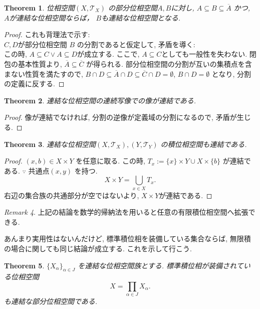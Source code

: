 \documentclass[dvipdfmx]{jbook}
\newcommand{\cl}[1]{\overline{ #1}  }
\newtheorem{theorem}{Theorem}[section]
\theoremstyle{remark}
\newtheorem{remark}[theorem]{Remark}
\theoremstyle{plain}
\begin{document}
\begin{theorem}
	位相空間$\left( X , \mathcal{T}_X \right) $ の部分位相空間$A,B$に対し, $A \subseteq B \subseteq \cl{A} $ かつ, $A$が連結な位相空間ならば， $B$も連結な位相空間となる.
\end{theorem}

\begin{proof}
	これも背理法で示す: \\
	$C,D$が部分位相空間 $B$ の分割であると仮定して, 矛盾を導く:\\
	この時,  $A \subseteq C \lor A \subseteq D$が成立する. 
	ここで, $A \subseteq C$としても一般性を失わない.
	閉包の基本性質より, $\cl{A} \subseteq \cl{C}$ が得られる. 
	部分位相空間の分割が互いの集積点を含まない性質を満たすので, 
	$B \cap D \subseteq \cl{A} \cap D \subseteq \cl{C} \cap D = \emptyset$, 
	$B \cap D = \emptyset$ となり, 分割の定義に反する.
\end{proof}

\begin{theorem}
	連結な位相空間の連続写像での像が連結である.
\end{theorem}

\begin{proof}
	像が連結でなければ, 分割の逆像が定義域の分割になるので, 矛盾が生じる.
\end{proof}

\begin{theorem}
	連結な位相空間$\left( X, \mathcal{T}_X \right) , \left( Y, \mathcal{T}_Y \right) $ の積位相空間も連結である.
\end{theorem}

\begin{proof}
	$(x,b) \in X \times Y $ を任意に取る. この時,
	$T_{x} := \{x\} \times Y \cup X \times \{b\}  $ が連結である. $\because$ 共通点$\left( x,y \right) $ を持つ.\\
	 \[
	X \times Y = \bigcup_{x \in X}T_x 
	.\] 
	右辺の集合族の共通部分が空ではないより, $X \times Y$が連結である.
\end{proof}

\begin{remark}
	上記の結論を数学的帰納法を用いると任意の有限積位相空間へ拡張できる.
\end{remark}

あんまり実用性はないんだけど, 標準積位相を装備している集合ならば, 無限積の場合に関しても同じ結論が成立する. これを示して行こう.

\begin{theorem}
	$\{X_{\alpha}\} _{\alpha \in J}$ を連結な位相空間族とする. 
	標準積位相が装備されている位相空間
	\[
	X = \prod_{\alpha \in J} X _{\alpha}  
	.\] 
	も連結な部分位相空間である.
\end{theorem}
\end{document}
